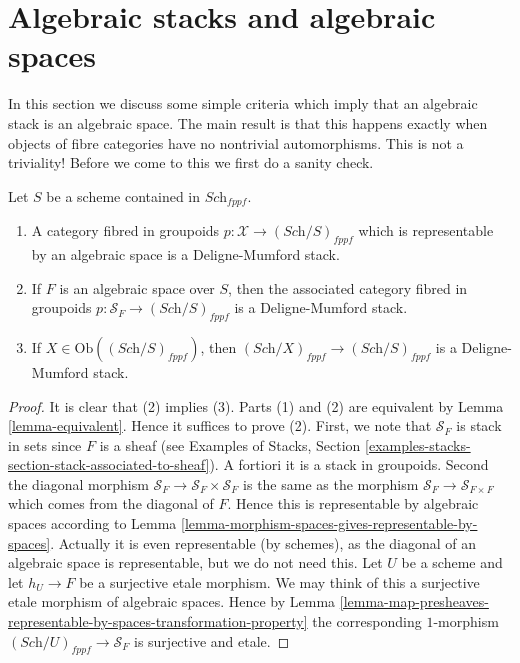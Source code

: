 \section{Algebraic stacks and algebraic spaces}
\label{section-stacks-spaces}

\noindent
In this section we discuss some simple criteria which imply that an
algebraic stack is an algebraic space. The main result is that this
happens exactly when objects of fibre categories have no nontrivial
automorphisms. This is not a triviality! Before we come to this
we first do a sanity check.

\begin{lemma}
\label{lemma-representable-algebraic}
Let $S$ be a scheme contained in $\textit{Sch}_{fppf}$.
\begin{enumerate}
\item A category fibred in groupoids
$p : \mathcal{X} \to (\textit{Sch}/S)_{fppf}$
which is representable by an algebraic space is a Deligne-Mumford stack.
\item If $F$ is an algebraic space over $S$, then the associated
category fibred in groupoids
$p : \mathcal{S}_F \to (\textit{Sch}/S)_{fppf}$
is a Deligne-Mumford stack.
\item If $X \in \text{Ob}((\textit{Sch}/S)_{fppf})$, then
$(\textit{Sch}/X)_{fppf} \to (\textit{Sch}/S)_{fppf}$ is
a Deligne-Mumford stack.
\end{enumerate}
\end{lemma}

\begin{proof}
It is clear that (2) implies (3).
Parts (1) and (2) are equivalent by Lemma \ref{lemma-equivalent}.
Hence it suffices to prove (2).
First, we note that $\mathcal{S}_F$ is stack in sets since
$F$ is a sheaf (see
Examples of Stacks,
Section \ref{examples-stacks-section-stack-associated-to-sheaf}).
A fortiori it is a stack in groupoids. Second the diagonal
morphism $\mathcal{S}_F \to \mathcal{S}_F  \times \mathcal{S}_F$
is the same as the morphism $\mathcal{S}_F \to \mathcal{S}_{F \times F}$
which comes from the diagonal of $F$. Hence this is representable
by algebraic spaces according to
Lemma \ref{lemma-morphism-spaces-gives-representable-by-spaces}.
Actually it is even representable (by schemes), as the diagonal of
an algebraic space is representable, but we do not need this.
Let $U$ be a scheme and let $h_U \to F$ be a surjective etale morphism.
We may think of this a surjective etale morphism of algebraic spaces.
Hence by
Lemma
\ref{lemma-map-presheaves-representable-by-spaces-transformation-property}
the corresponding $1$-morphism $(\textit{Sch}/U)_{fppf} \to \mathcal{S}_F$
is surjective and etale.
\end{proof}

